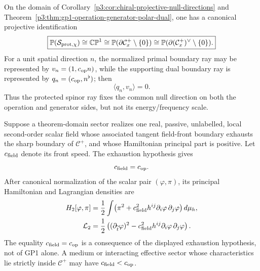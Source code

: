\documentclass[12pt,a4paper]{article}
\begin{document}
\begin{corollary}
\label{p3e:cor:projective-primal-dual-null-ray}
On the domain of Corollary~\ref{p3:cor:chiral-projective-null-directions} and
Theorem~\ref{p3:thm:gp1-operation-generator-polar-dual}, one has a canonical
projective identification
\[
 \boxed{\mathbb P(\mathcal S_{{\rm prot},\chi})\cong\mathbb{CP}^1
 \cong \mathbb P(\partial\mathcal C_x^+\setminus\{0\})
 \cong \mathbb P(\partial(\mathcal C_x^+)^\vee\setminus\{0\}).}
\]
For a unit spatial direction \(n\), the normalized primal boundary ray may be
represented by \(v_n=(1,c_{\rm op}n)\), while the supporting dual boundary
ray is represented by \(q_n=(c_{\rm op},n^\flat)\); then
\[
 \langle q_n,v_n\rangle=0.
\]
Thus the protected spinor ray fixes the common null direction on both the
operation and generator sides, but not its energy/frequency scale.
\end{corollary}

\begin{corollary}
\label{p3:cor:causal-scalar-principal-part}
Suppose a theorem-domain sector realizes one real, passive, unlabelled,
local second-order scalar field whose associated tangent field-front boundary
exhausts the sharp boundary of \(\mathcal C^+\), and whose Hamiltonian
principal part is positive.  Let \(c_{\rm field}\) denote its front speed.
The exhaustion hypothesis gives
\[
        c_{\rm field}=c_{\rm op}.
\]
After canonical normalization of the scalar pair
\((\varphi,\pi)\), its principal Hamiltonian and Lagrangian densities are
\begin{align}
 H_2[\varphi,\pi]
 &=
 \frac12\int\!\left(\pi^2+
 c_{\rm field}^2h^{ij}\partial_i\varphi\,\partial_j\varphi\right)d\mu_h,
 \label{p3:eq:minimal-positive-scalar-hamiltonian}\\
 \mathcal L_2
 &=
 \frac12\left((\partial_{\widetilde t}\varphi)^2-
 c_{\rm field}^2h^{ij}\partial_i\varphi\,\partial_j\varphi\right).
 \label{p3:eq:minimal-lorentzian-scalar-lagrangian}
\end{align}
The equality \(c_{\rm field}=c_{\rm op}\) is a consequence of the displayed
exhaustion hypothesis, not of GP1 alone.  A medium or interacting effective
sector whose characteristics lie strictly inside \(\mathcal C^+\) may have
\(c_{\rm field}<c_{\rm op}\).
\end{corollary}
\end{document}

